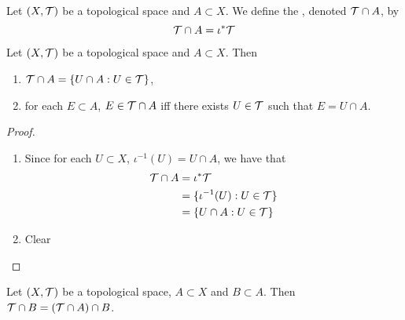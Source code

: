 \documentclass{book}
\begin{document}
\begin{defn} 
	Let $(X, \mathcal{T})$ be a topological space and $A \subset X$. We define the , denoted $\mathcal{T} \cap A$, by $$\mathcal{T} \cap A = \iota^* \mathcal{T} $$
\end{defn}

\begin{ex} 
	Let $(X, \mathcal{T})$ be a topological space and $A \subset X$. Then 
	\begin{enumerate}
		\item $\mathcal{T} \cap A = \{U \cap A: U \in \mathcal{T}\}$,
		\item for each $E \subset A$, $E \in \mathcal{T} \cap A$ iff there exists $U \in \mathcal{T}$ such that $E = U \cap A$. 
	\end{enumerate}
\end{ex}

\begin{proof}\
	\begin{enumerate}
		\item Since for each $U \subset X$, $\iota^{-1}(U) = U \cap A$, we have that 
		\begin{align*}
			\mathcal{T} \cap A
			& = \iota^* \mathcal{T} \\
			& = \{\iota^{-1}(U): U \in \mathcal{T}\} \\
			& = \{ U \cap A: U \in \mathcal{T}\} \\
		\end{align*}
		\item Clear
	\end{enumerate}
\end{proof}

\begin{ex} 
	Let $(X, \mathcal{T})$ be a topological space, $A \subset X$ and $B \subset A$. Then $\mathcal{T} \cap B = (\mathcal{T} \cap A) \cap B$.
\end{ex}
\end{document}
